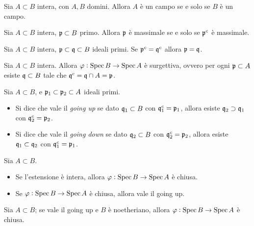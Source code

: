 \begin{lemma}
    Sia $A\subset B$ intera, con $A,B$ domini. Allora $A$ è un campo se e solo se $B$ è un campo.
\end{lemma}

\begin{corollary}
    Sia $A\subset B$ intera, $\mathfrak{p}\subset B$ primo. Allora $\mathfrak{p}$ è massimale se e solo se $\mathfrak{p}^c$ è massimale.
\end{corollary}

\begin{lemma}
    Sia $A\subset B$ intera, $\mathfrak{p}\subset \mathfrak{q}\subset B$ ideali primi. Se $\mathfrak{p}^c=\mathfrak{q}^c$ allora $\mathfrak{p}=\mathfrak{q}$.
\end{lemma}

\begin{theorem}
    Sia $A\subset B$ intera. Allora $\varphi:\operatorname{Spec} B\to\operatorname{Spec} A$ è surgettiva, ovvero per ogni $\mathfrak{p}\subset A$ esiste $\mathfrak{q}\subset B$ tale che $\mathfrak{q}^c=\mathfrak{q}\cap A=\mathfrak{p}$.
\end{theorem}

\begin{definition} Sia $A\subset B$, e $\mathfrak{p}_1\subset \mathfrak{p}_2\subset A$ ideali primi.
    \begin{itemize}
        \item Si dice che vale il \emph{going up} se dato $\mathfrak{q}_1\subset B$ con $\mathfrak{q}_1^c=\mathfrak{p}_1$, allora esiste $\mathfrak{q}_2\supset\mathfrak{q}_1$ con $\mathfrak{q}_2^c=\mathfrak{p}_2$.
        \item Si dice che vale il \emph{going down} se dato $\mathfrak{q}_2\subset B$ con $\mathfrak{q}_2^c=\mathfrak{p}_2$, allora esiste $\mathfrak{q}_1\subset\mathfrak{q}_2$ con $\mathfrak{q}_1^c=\mathfrak{p}_1$.
    \end{itemize}
\end{definition}

\begin{theorem} Sia $A\subset B$.
    \begin{itemize}
        \item Se l'estensione è intera, allora $\varphi: \operatorname{Spec} B\to\operatorname{Spec} A$ è chiusa.
        \item Se $\varphi: \operatorname{Spec} B\to\operatorname{Spec} A$ è chiusa, allora vale il going up.
    \end{itemize}
\end{theorem}

\begin{proposition}
    Sia $A\subset B$; se vale il going up e $B$ è noetheriano, allora $\varphi:\operatorname{Spec} B\to\operatorname{Spec} A$ è chiusa.
\end{proposition}

